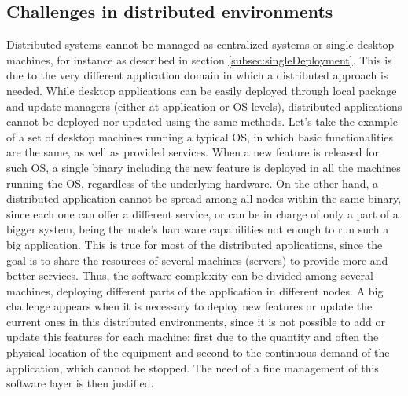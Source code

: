 \subsection{Challenges in distributed environments}
Distributed systems cannot be managed as centralized systems or single desktop machines, for instance as described in section \ref{subsec:singleDeployment}.
This is due to the very different application domain in which a distributed approach is needed.
While desktop applications can be easily deployed through local package and update managers (either at application or OS levels), distributed applications cannot be deployed nor updated using the same methods.
Let's take the example of a set of desktop machines running a typical OS, in which basic functionalities are the same, as well as provided services.
When a new feature is released for such OS, a single binary including the new feature is deployed in all the machines running the OS, regardless of the underlying hardware.
On the other hand, a distributed application cannot be spread among all nodes within the same binary, since each one can offer a different service, or can be in charge of only a part of a bigger system, being the node's hardware capabilities not enough to run such a big application.
This is true for most of the distributed applications, since the goal is to share the resources of several machines (servers) to provide more and better services.
Thus, the software complexity can be divided among several machines, deploying different parts of the application in different nodes.
A big challenge appears when it is necessary to deploy new features or update the current ones in this distributed environments, since it is not possible to add or update this features for each machine: first due to the quantity and often the physical location of the equipment and second to the continuous demand of the application, which cannot be stopped.
The need of a fine management of this software layer is then justified.

